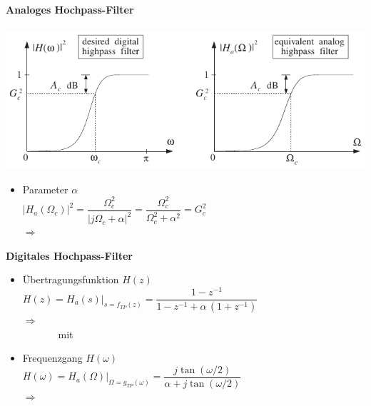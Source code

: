 	\begin{minipage}{0.045\textwidth}
		\begin{tabular}{c|c}
			\\[17.5cm]
		\end{tabular}
	\end{minipage}
	\begin{minipage}{0.48\textwidth}
		\textbf{\large{Analoges Hochpass-Filter}}\\[0.2cm]
		\\[0.2cm]
		\includegraphics[width = \textwidth]{pic/HP1ordnung.pdf}\\[-0.5cm]
		\begin{itemize}
		 \item Parameter $\alpha$\\[0.1cm]
		 $\big|H_a(\Omega_c)\big|^2 = \dfrac{\Omega_c^2}{|j\Omega_c+\alpha|^2} = \dfrac{\Omega_c^2}{\Omega_c^2+\alpha^2} = G_c^2$\\[0.2cm]
		 $\Rightarrow\quad\;$\\[0.2cm]
		\end{itemize}
		\textbf{\large{Digitales Hochpass-Filter}}\\[-0.25cm]
		\begin{itemize}
		 \item Übertragungsfunktion $H(z)$\\[0.05cm]
		 $H(z) = H_a(s)\Big|_{s=f_{TP}(z)}=\dfrac{1-z^{-1}}{1-z^{-1}+\alpha\,(1+z^{-1})}\!\!\!\!\!\!$\\[0.25cm]
		 $\Rightarrow\quad\;$$\quad$\\[0.2cm]
		 \textcolor{white}{$\Rightarrow\quad\quad$}mit$\quad$\\[0.1cm]
		 \item Frequenzgang $H(\omega)$\\[0.2cm]
		 $H(\omega) = H_a(\Omega)\Big|_{\Omega=g_{TP}(\omega)}=\dfrac{j\tan(\omega/2)}{\alpha + j\tan(\omega/2)}$\\[0.25cm]
		 $\Rightarrow\quad\;$
		\end{itemize}
	\end{minipage}
